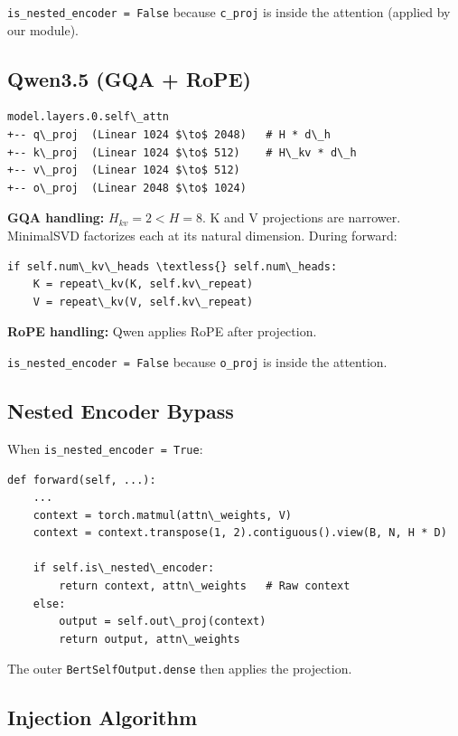 \texttt{is\_nested\_encoder = False} because \texttt{c\_proj} is inside the attention (applied 
by our module).

\subsection{Qwen3.5 (GQA + RoPE)}

\begin{lstlisting}
model.layers.0.self\_attn
+-- q\_proj  (Linear 1024 $\to$ 2048)   # H * d\_h
+-- k\_proj  (Linear 1024 $\to$ 512)    # H\_kv * d\_h
+-- v\_proj  (Linear 1024 $\to$ 512)
+-- o\_proj  (Linear 2048 $\to$ 1024)
\end{lstlisting}

\textbf{GQA handling:} $H_{kv} = 2 < H = 8$. K and V projections are narrower. 
MinimalSVD factorizes each at its natural dimension. During forward:

\begin{lstlisting}
if self.num\_kv\_heads \textless{} self.num\_heads:
    K = repeat\_kv(K, self.kv\_repeat)
    V = repeat\_kv(V, self.kv\_repeat)
\end{lstlisting}

\textbf{RoPE handling:} Qwen applies RoPE after projection.

\texttt{is\_nested\_encoder = False} because \texttt{o\_proj} is inside the attention.

\subsection{Nested Encoder Bypass}

When \texttt{is\_nested\_encoder = True}:

\begin{lstlisting}
def forward(self, ...):
    ...
    context = torch.matmul(attn\_weights, V)
    context = context.transpose(1, 2).contiguous().view(B, N, H * D)
    
    if self.is\_nested\_encoder:
        return context, attn\_weights   # Raw context
    else:
        output = self.out\_proj(context)
        return output, attn\_weights
\end{lstlisting}

The outer \texttt{BertSelfOutput.dense} then applies the projection.

\subsection{Injection Algorithm}

